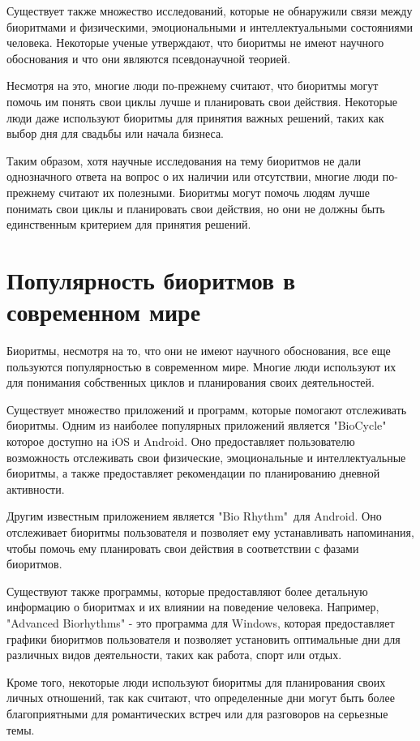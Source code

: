 Существует также множество исследований, которые не обнаружили связи между биоритмами и физическими, эмоциональными и интеллектуальными состояниями человека. Некоторые ученые утверждают, что биоритмы не имеют научного обоснования и что они являются псевдонаучной теорией.

Несмотря на это, многие люди по-прежнему считают, что биоритмы могут помочь им понять свои циклы лучше и планировать свои действия. Некоторые люди даже используют биоритмы для принятия важных решений, таких как выбор дня для свадьбы или начала бизнеса.

Таким образом, хотя научные исследования на тему биоритмов не дали однозначного ответа на вопрос о их наличии или отсутствии, многие люди по-прежнему считают их полезными. Биоритмы могут помочь людям лучше понимать свои циклы и планировать свои действия, но они не должны быть единственным критерием для принятия решений.

\newpage

\section{Популярность биоритмов в современном мире}

Биоритмы, несмотря на то, что они не имеют научного обоснования, все еще пользуются популярностью в современном мире. Многие люди используют их для понимания собственных циклов и планирования своих деятельностей.

Существует множество приложений и программ, которые помогают отслеживать биоритмы. Одним из наиболее популярных приложений является  "BioCycle"\, которое доступно на iOS и Android. Оно предоставляет пользователю возможность отслеживать свои физические, эмоциональные и интеллектуальные биоритмы, а также предоставляет рекомендации по планированию дневной активности.

Другим известным приложением является  "Bio Rhythm"\ для Android. Оно отслеживает биоритмы пользователя и позволяет ему устанавливать напоминания, чтобы помочь ему планировать свои действия в соответствии с фазами биоритмов.

Существуют также программы, которые предоставляют более детальную информацию о биоритмах и их влиянии на поведение человека. Например, "Advanced Biorhythms" - это программа для Windows, которая предоставляет графики биоритмов пользователя и позволяет установить оптимальные дни для различных видов деятельности, таких как работа, спорт или отдых.

Кроме того, некоторые люди используют биоритмы для планирования своих личных отношений, так как считают, что определенные дни могут быть более благоприятными для романтических встреч или для разговоров на серьезные темы.

